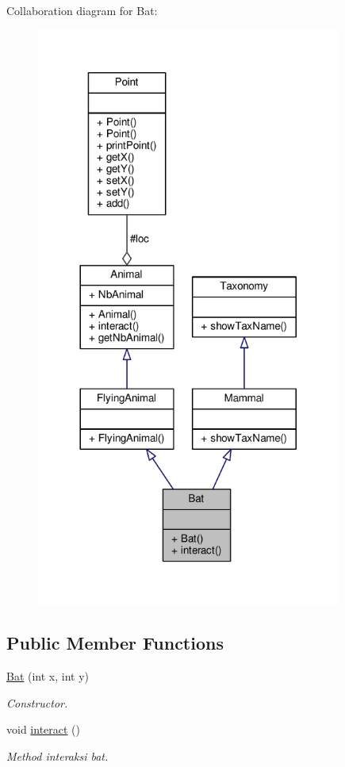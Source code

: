 Collaboration diagram for Bat\+:
\nopagebreak
\begin{figure}[H]
\begin{center}
\leavevmode
\includegraphics[width=284pt]{classBat__coll__graph}
\end{center}
\end{figure}
\subsection*{Public Member Functions}
\begin{DoxyCompactItemize}
\item 
\hyperlink{classBat_a5d54305430e0d7a6e104a3fd5a944945}{Bat} (int x, int y)
\begin{DoxyCompactList}\small\item\em Constructor. \end{DoxyCompactList}\item 
void \hyperlink{classBat_adf63bb33699532d83e680252c4b7021c}{interact} ()\hypertarget{classBat_adf63bb33699532d83e680252c4b7021c}{}\label{classBat_adf63bb33699532d83e680252c4b7021c}

\begin{DoxyCompactList}\small\item\em Method interaksi bat. \end{DoxyCompactList}\end{DoxyCompactItemize}
